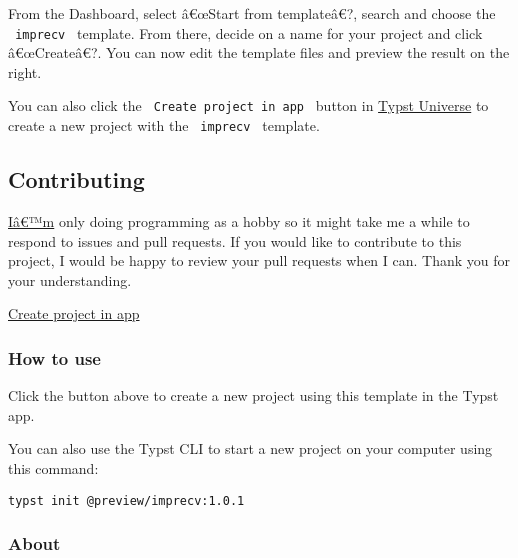 From the Dashboard, select â€œStart from templateâ€?, search and choose
the \texttt{\ imprecv\ } template. From there, decide on a name for your
project and click â€œCreateâ€?. You can now edit the template files and
preview the result on the right.

You can also click the \texttt{\ Create\ project\ in\ app\ } button in
\href{https://typst.app/universe/package/imprecv}{Typst Universe} to
create a new project with the \texttt{\ imprecv\ } template.

\subsection{Contributing}\label{contributing}

\href{https://github.com/jskherman}{Iâ€™m} only doing programming as a
hobby so it might take me a while to respond to issues and pull
requests. If you would like to contribute to this project, I would be
happy to review your pull requests when I can. Thank you for your
understanding.

\href{/app?template=imprecv&version=1.0.1}{Create project in app}

\subsubsection{How to use}\label{how-to-use}

Click the button above to create a new project using this template in
the Typst app.

You can also use the Typst CLI to start a new project on your computer
using this command:

\begin{verbatim}
typst init @preview/imprecv:1.0.1
\end{verbatim}



\subsubsection{About}\label{about}


